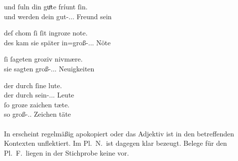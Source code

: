 \begin{exe}
\ex \label{ex:kca1regel}
	\begin{xlist}
	\ex \label{ex:kca1regel_1}
		\gll und ſuln din guͦte fríunt ſin. \\
			und werden dein gut-\Nom.\Pl.\MascA.\St{} Freund sein \\
		\begin{taggedline}{\parencites[\pno~13\rb, 3]{kc:A1}[vgl.][3089]{schroeder1895}}
		\trans {}
		\end{taggedline}

	\ex \label{ex:kca1regel_2}
		\gll deſ chom ſi ſit ingroze note. \\
			des kam sie später in=groß-\Acc.\Pl.\FemI.\St{} Nöte \\
		\begin{taggedline}{\parencites[\pno~49\vb, 13]{kc:A1}[vgl.][11413]{schroeder1895}}
		\trans {}
		\end{taggedline}

	\ex \label{ex:kca1regel_3}
		\gll ſi ſageten groziv nivmære. \\
			sie sagten groß-\Acc.\Pl.\NeutI.\St{} Neuigkeiten \\
		\begin{taggedline}{\parencites[\pno~33\rb, 33]{kc:A1}[vgl.][7710]{schroeder1895}}
		\trans {}
		\end{taggedline}
	\end{xlist}

\ex\label{ex:kca1akkplne}
	\gll der durch ſine lute. \\
		der durch sein-\Acc.\Pl.\MascA.\St{} Leute \\
\sn \gll ſo groze zaichen tæte. \\
		so groß-\Acc.\Pl.\NeutI{} Zeichen täte \\
	\begin{taggedline}{\parencites[\pno~45\rb, 10--11]{kc:A1}[vgl.][10331--10332]{schroeder1895}}
		\trans {}
	\end{taggedline}
\end{exe}

\paragraph{\citet{kc:M}}
In \citet{kc:M} erscheint  regelmäßig apokopiert oder das Adjektiv ist
in den betreffenden Kontexten unflektiert. Im Pl.\ N.\ ist dagegen klar
 bezeugt. Belege für den Pl.\ F.\ liegen in der Stichprobe
keine vor.

